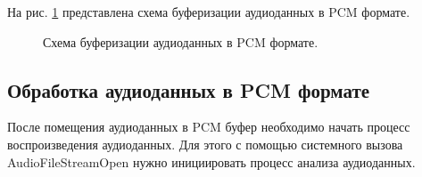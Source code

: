         \par На рис. \ref{fig:schema-pcm-buff} представлена схема буферизации аудиоданных в PCM формате.
        \begin{figure}[!h]
            \caption{Схема буферизации аудиоданных в PCM формате.}
            \label{fig:schema-pcm-buff}
        \end{figure}

    \subsection{Обработка аудиоданных в PCM формате}
        \par После помещения аудиоданных в PCM буфер необходимо начать процесс воспроизведения аудиоданных.
        Для этого с помощью системного вызова \newline AudioFileStreamOpen нужно инициировать процесс анализа аудиоданных.
        
